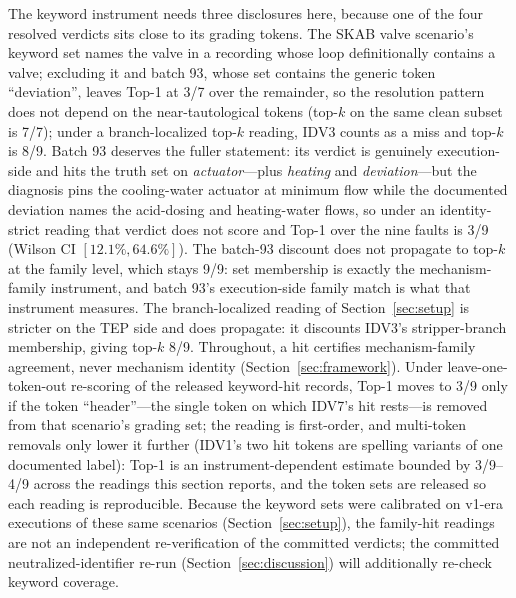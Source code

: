\documentclass[preprint,12pt]{elsarticle}
\begin{document}
The keyword instrument needs three disclosures here, because one of the four resolved verdicts sits close to its grading tokens. The SKAB valve scenario's keyword set names the valve in a recording whose loop definitionally contains a valve; excluding it and batch 93, whose set contains the generic token ``deviation'', leaves Top-1 at 3/7 over the remainder, so the resolution pattern does not depend on the near-tautological tokens (top-$k$ on the same clean subset is 7/7); under a branch-localized top-$k$ reading, IDV3 counts as a miss and top-$k$ is 8/9. Batch 93 deserves the fuller statement: its verdict is genuinely execution-side and hits the truth set on \emph{actuator}---plus \emph{heating} and \emph{deviation}---but the diagnosis pins the cooling-water actuator at minimum flow while the documented deviation names the acid-dosing and heating-water flows, so under an identity-strict reading that verdict does not score and Top-1 over the nine faults is 3/9 (Wilson CI $[12.1\%,64.6\%]$). The batch-93 discount does not propagate to top-$k$ at the family level, which stays 9/9: set membership is exactly the mechanism-family instrument, and batch 93's execution-side family match is what that instrument measures. The branch-localized reading of Section~\ref{sec:setup} is stricter on the TEP side and does propagate: it discounts IDV3's stripper-branch membership, giving top-$k$ 8/9. Throughout, a hit certifies mechanism-family agreement, never mechanism identity (Section~\ref{sec:framework}). Under leave-one-token-out re-scoring of the released keyword-hit records, Top-1 moves to 3/9 only if the token ``header''---the single token on which IDV7's hit rests---is removed from that scenario's grading set; the reading is first-order, and multi-token removals only lower it further (IDV1's two hit tokens are spelling variants of one documented label): Top-1 is an instrument-dependent estimate bounded by 3/9--4/9 across the readings this section reports, and the token sets are released so each reading is reproducible. Because the keyword sets were calibrated on v1-era executions of these same scenarios (Section~\ref{sec:setup}), the family-hit readings are not an independent re-verification of the committed verdicts; the committed neutralized-identifier re-run (Section~\ref{sec:discussion}) will additionally re-check keyword coverage.
\end{document}
